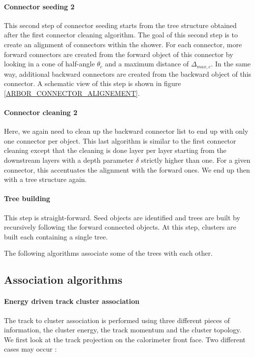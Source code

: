 \documentclass[cits]{JINST}
\begin{document}
\paragraph*{Connector seeding 2} This second step of connector seeding starts from the tree structure obtained after the first connector cleaning algorithm. The goal of this second step is to create an alignment of connectors within the shower. For each connector, more forward connectors are created from the forward object of this connector by looking in a cone of half-angle $\theta_c$ and a maximum distance of $\Delta_{max,c}$. In the same way, additional backward connectors are created from the backward object of this connector. A schematic view of this step is shown in figure \ref{ARBOR_CONNECTOR_ALIGNEMENT}.

\paragraph*{Connector cleaning 2} Here, we again need to clean up the backward connector list to end up with only one connector per object. This last algorithm is similar to the first connector cleaning except that the cleaning is done layer per layer starting from the downstream layers with a depth parameter $\delta$ strictly higher than one. For a given connector, this accentuates the alignment with the forward ones. We end up then with a tree structure again.

\paragraph*{Tree building} This step is straight-forward. Seed objects are identified and trees are built by recursively following the forward connected objects. At this step, clusters are built each containing a single tree. 

The following algorithms associate some of the trees with each other.

\subsection{Association algorithms}

\paragraph*{Energy driven track cluster association} The track to cluster association is performed using three different pieces of information, the cluster energy, the track momentum and the cluster topology. We first look at the track projection on the calorimeter front face. Two different cases may occur :
\end{document}
